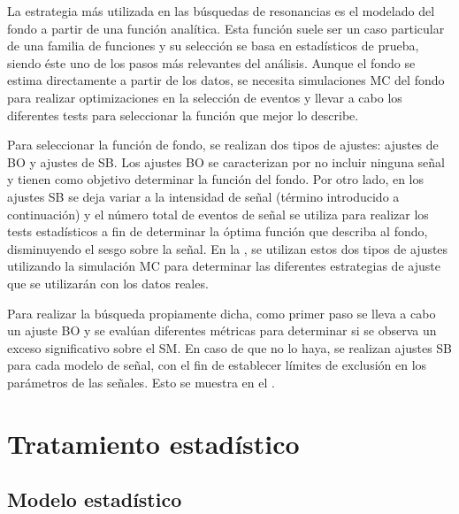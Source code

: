 La estrategia más utilizada en las búsquedas de resonancias es el modelado del fondo a partir de una función analítica. Esta función suele ser un caso particular de una familia de funciones y su selección se basa en estadísticos de prueba, siendo éste uno de los pasos más relevantes del análisis.
Aunque el fondo se estima directamente a partir de los datos, se necesita simulaciones \ac{MC} del fondo para realizar optimizaciones en la selección de eventos y llevar a cabo los diferentes tests para seleccionar la función que mejor lo describe.

Para seleccionar la función de fondo, se realizan dos tipos de ajustes: ajustes de \acf{BO} y ajustes de \acf{SB}. Los ajustes \ac{BO} se caracterizan por no incluir ninguna señal y tienen como objetivo determinar la función del fondo.
Por otro lado, en los ajustes \ac{SB} se deja variar a la intensidad de señal (término introducido a continuación) y el número total de eventos de señal se utiliza para realizar los tests estadísticos a fin de determinar la óptima función que describa al fondo, disminuyendo el sesgo sobre la señal. En la \Sect{\ref{sec:bkg:modeling}}, se utilizan estos dos tipos de ajustes utilizando la simulación \ac{MC} para determinar las diferentes estrategias de ajuste que se utilizarán con los datos reales.

Para realizar la búsqueda propiamente dicha, como primer paso se lleva a cabo un ajuste \ac{BO} y se evalúan diferentes métricas para determinar si se observa un exceso significativo sobre el \ac{SM}. En caso de que no lo haya, se realizan ajustes \ac{SB} para cada modelo de señal, con el fin de establecer límites de exclusión en los parámetros de las señales. Esto se muestra en el \Ch{\ref{ch:results}}.






\section{Tratamiento estadístico}
\label{sec:strategy:stat_treatment}




\subsection{Modelo estadístico}
\label{subsec:strategy:stat_treatment:stat_model}

